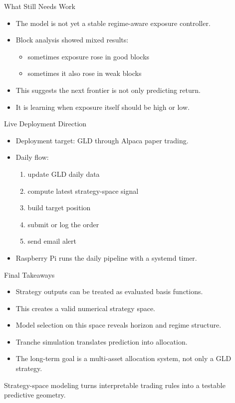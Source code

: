 \documentclass[aspectratio=169]{beamer}
\begin{document}
\begin{frame}{What Still Needs Work}
  \begin{itemize}
    \item The model is not yet a stable regime-aware exposure controller.
    \item Block analysis showed mixed results:
    \begin{itemize}
      \item sometimes exposure rose in good blocks
      \item sometimes it also rose in weak blocks
    \end{itemize}
    \item This suggests the next frontier is not only predicting return.
    \item It is learning when exposure itself should be high or low.
  \end{itemize}
\end{frame}

\begin{frame}{Live Deployment Direction}
  \begin{itemize}
    \item Deployment target: GLD through Alpaca paper trading.
    \item Daily flow:
    \begin{enumerate}
      \item update GLD daily data
      \item compute latest strategy-space signal
      \item build target position
      \item submit or log the order
      \item send email alert
    \end{enumerate}
    \item Raspberry Pi runs the daily pipeline with a systemd timer.
  \end{itemize}
\end{frame}

\begin{frame}{Final Takeaways}
  \begin{itemize}
    \item Strategy outputs can be treated as evaluated basis functions.
    \item This creates a valid numerical strategy space.
    \item Model selection on this space reveals horizon and regime structure.
    \item Tranche simulation translates prediction into allocation.
    \item The long-term goal is a multi-asset allocation system, not only a GLD strategy.
  \end{itemize}

  \vspace{0.8em}
  \centering
  \large
  Strategy-space modeling turns interpretable trading rules into a testable predictive geometry.
\end{frame}
\end{document}
